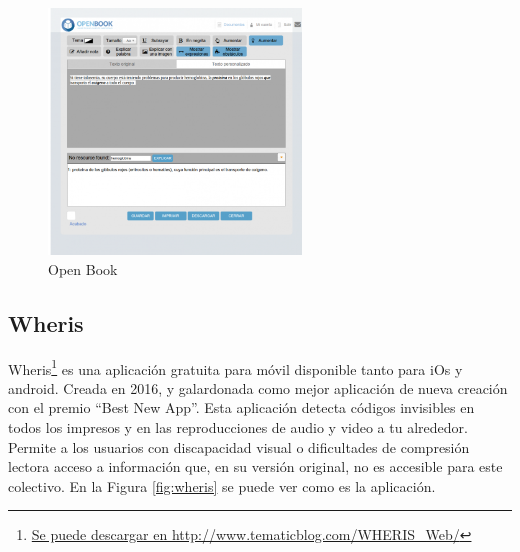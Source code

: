 \begin{figure}[h]
	\centering
	\includegraphics[width=0.6\textwidth]{Imagenes/ProyectosMateriales/openBook}
	\caption{Open Book}
	\label{fig:openBook}
\end{figure} 

\subsection{Wheris }

Wheris\footnote{\href{http://www.tematicblog.com/WHERIS\_Web//}{Se puede descargar en http://www.tematicblog.com/WHERIS\_Web/}} es una aplicación gratuita para móvil disponible tanto para iOs y android. Creada en 2016, y galardonada como mejor aplicación de nueva creación con el premio ``Best New App''. Esta aplicación detecta códigos invisibles en todos los impresos y en las reproducciones de audio y video a tu alrededor. Permite a los usuarios con discapacidad visual o dificultades de compresión lectora acceso a información que, en su versión original, no es accesible para este colectivo. En la Figura \ref{fig:wheris} se puede ver como es la aplicación.



